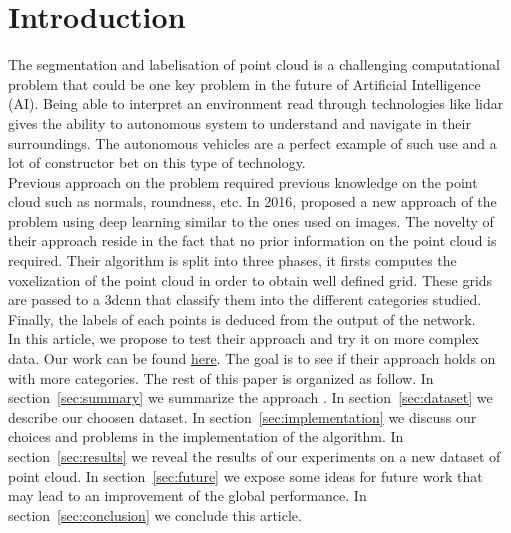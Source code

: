 \section{Introduction}
\label{sec:intro}

The segmentation and labelisation of point cloud is a challenging computational problem that could be one key problem in the future of Artificial Intelligence (AI). Being able to interpret an environment read through technologies like \gls{lidar} gives the ability to autonomous system to understand and navigate in their surroundings. The autonomous vehicles are a perfect example of such use and a lot of constructor bet on this type of technology.\\

Previous approach on the problem required previous knowledge on the point cloud such as normals, roundness, etc. In 2016, \citeauthor*{7900038} \cite{7900038} proposed a new approach of the problem using deep learning similar to the ones used on images. The novelty of their approach reside in the fact that no prior information on the point cloud is required. Their algorithm is split into three phases, it firsts computes the voxelization of the point cloud in order to obtain well defined grid. These grids are passed to a \gls{3dcnn} that classify them into the different categories studied.
Finally, the labels of each points is deduced from the output of the network.\\

In this article, we propose to test their approach and try it on more complex data. Our work can be found \href{https://github.com/XanX3601/point_cloud_labeling.git}{here}. The goal is to see if their approach holds on with more categories. The rest of this paper is organized as follow. In section~\ref{sec:summary} we summarize the approach \cite{7900038}. In section~\ref{sec:dataset} we describe our choosen dataset. In section~\ref{sec:implementation} we discuss our choices and problems in the implementation of the algorithm. In section~\ref{sec:results} we reveal the results of our experiments on a new dataset of point cloud. In section~\ref{sec:future} we expose some ideas for future work that may lead to an improvement of the global performance. In section~\ref{sec:conclusion} we conclude this article.
